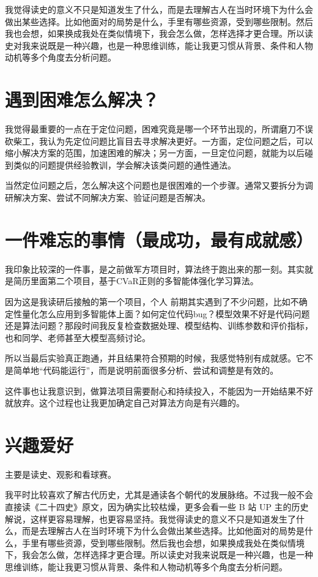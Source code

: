 \documentclass[12pt,a4paper]{article}
\begin{document}
我觉得读史的意义不只是知道发生了什么，而是去理解古人在当时环境下为什么会做出某些选择。比如他面对的局势是什么，手里有哪些资源，受到哪些限制。然后我也会想，如果换成我处在类似情境下，我会怎么做，怎样选择才更合理。所以读史对我来说既是一种兴趣，也是一种思维训练，能让我更习惯从背景、条件和人物动机等多个角度去分析问题。

\section{遇到困难怎么解决？}
我觉得最重要的一点在于定位问题，困难究竟是哪一个环节出现的，所谓磨刀不误砍柴工，我认为先定位问题比盲目去寻求解决更好。一方面，定位问题之后，可以缩小解决方案的范围，加速困难的解决；另一方面，一旦定位问题，就能为以后碰到类似的问题提供经验教训，学会解决该类问题的通性通法。

当然定位问题之后，怎么解决这个问题也是很困难的一个步骤。通常又要拆分为调研解决方案、尝试不同解决方案、验证问题是否解决。


\section{一件难忘的事情（最成功，最有成就感）}
我印象比较深的一件事，是之前做军方项目时，算法终于跑出来的那一刻。其实就是简历里面第二个项目，基于CVaR正则的多智能体强化学习算法。

因为这是我读研后接触的第一个项目，个人
前期其实遇到了不少问题，比如不确定性量化怎么应用到多智能体上面？如何定位代码bug？模型效果不好是代码问题还是算法问题？那段时间我反复检查数据处理、模型结构、训练参数和评价指标，也和同学、老师甚至大模型高频讨论。

所以当最后实验真正跑通，并且结果符合预期的时候，我感觉特别有成就感。它不是简单地“代码能运行”，而是说明前面很多分析、尝试和调整是有效的。

这件事也让我意识到，做算法项目需要耐心和持续投入，不能因为一开始结果不好就放弃。这个过程也让我更加确定自己对算法方向是有兴趣的。


\section{兴趣爱好}
主要是读史、观影和看球赛。

我平时比较喜欢了解古代历史，尤其是通读各个朝代的发展脉络。不过我一般不会直接读《二十四史》原文，因为确实比较枯燥，更多会看一些 B 站 UP 主的历史解说，这样更容易理解，也更容易坚持。我觉得读史的意义不只是知道发生了什么，而是去理解古人在当时环境下为什么会做出某些选择。比如他面对的局势是什么，手里有哪些资源，受到哪些限制。然后我也会想，如果换成我处在类似情境下，我会怎么做，怎样选择才更合理。所以读史对我来说既是一种兴趣，也是一种思维训练，能让我更习惯从背景、条件和人物动机等多个角度去分析问题。
\end{document}
